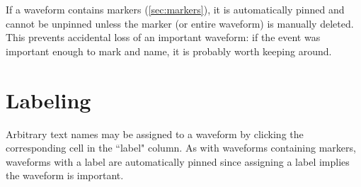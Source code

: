 If a waveform contains markers (\ref{sec:markers}), it is automatically pinned and cannot be unpinned unless the marker
(or entire waveform) is manually deleted. This prevents accidental loss of an important waveform: if the event was
important enough to mark and name, it is probably worth keeping around.

\section{Labeling}

Arbitrary text names may be assigned to a waveform by clicking the corresponding cell in the ``label" column. As with
waveforms containing markers, waveforms with a label are automatically pinned since assigning a label implies the
waveform is important.

